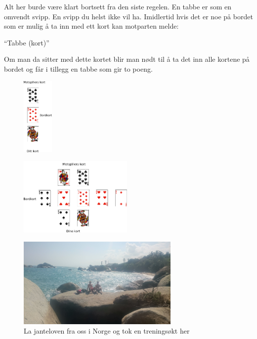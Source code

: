 Alt her burde være klart bortsett fra den siste regelen. En tabbe er
som en omvendt svipp. En svipp du helst ikke vil ha. Imidlertid hvis
det er noe på bordet som er mulig å ta inn med ett kort kan motparten
melde:
\begin{dialogue}
	\item ``Tabbe (kort)''
\end{dialogue}
Om man da sitter med dette kortet blir man nødt til å ta det inn alle
kortene på bordet og får i tillegg en tabbe som gir to poeng. 

\begin{figure}
\centering
\begin{minipage}{.3\paperwidth}
  \centering
  \includegraphics[height=1.5in]{tabbenkel}
  \label{fig:test1}
\end{minipage}%
\begin{minipage}{.6\textwidth}
  \centering
  \includegraphics[height=1.5in]{avanserttabbe}
  \label{fig:test2}
\end{minipage}
\end{figure}


\begin{figure}[H]
	\centering
	\includegraphics[width=0.7\textwidth]{tayronapark}
	\caption*{La janteloven fra oss i Norge og tok en treningsøkt
	her}
	\label{fig:tayronapark}
\end{figure}

